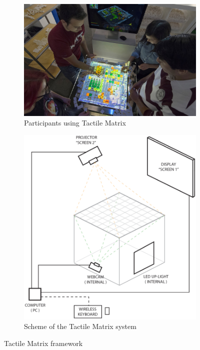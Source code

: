 \begin{figure}[h]
    \centering
    \begin{subfigure}{0.5\linewidth}
        \includegraphics[width=\linewidth]{figures/tactile.jpg}
        \caption{Participants using Tactile Matrix}
    \end{subfigure}
    \begin{subfigure}{0.35\linewidth}
        \includegraphics[width=\linewidth]{figures/tactilematrixelectronics.png}
        \caption{Scheme of the Tactile Matrix system}
    \end{subfigure}
    \caption{Tactile Matrix framework}
    \label{fig:tactilematrix}
\end{figure}

